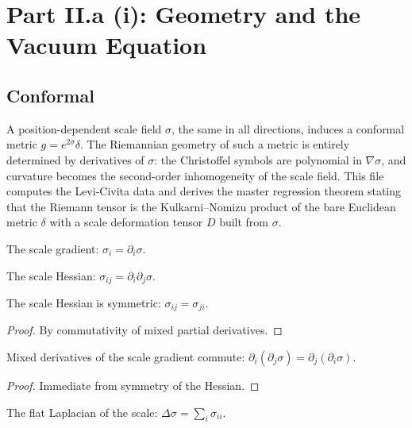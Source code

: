 \section{Part II.a (i): Geometry and the Vacuum Equation}

\subsection{Conformal}

A position-dependent scale field $\sigma$, the same in all directions, induces a conformal metric $g = e^{2\sigma}\delta$. The Riemannian geometry of such a metric is entirely determined by derivatives of $\sigma$: the Christoffel symbols are polynomial in $\nabla \sigma$, and curvature becomes the second-order inhomogeneity of the scale field. This file computes the Levi-Civita data and derives the master regression theorem stating that the Riemann tensor is the Kulkarni--Nomizu product of the bare Euclidean metric $\delta$ with a scale deformation tensor $D$ built from $\sigma$.

\begin{definition}
The scale gradient: $\sigma_i = \partial_i \sigma$. 
\end{definition}

\begin{definition}
The scale Hessian: $\sigma_{ij} = \partial_i \partial_j \sigma$. 
\end{definition}

\begin{theorem}
The scale Hessian is symmetric: $\sigma_{ij} = \sigma_{ji}$. 
\end{theorem}

\begin{proof}
By commutativity of mixed partial derivatives.
\end{proof}

\begin{theorem}
Mixed derivatives of the scale gradient commute: $\partial_i (\partial_j \sigma) = \partial_j (\partial_i \sigma)$. 
\end{theorem}

\begin{proof}
Immediate from symmetry of the Hessian.
\end{proof}

\begin{definition}
The flat Laplacian of the scale: $\Delta\sigma = \sum_i \sigma_{ii}$. 
\end{definition}

